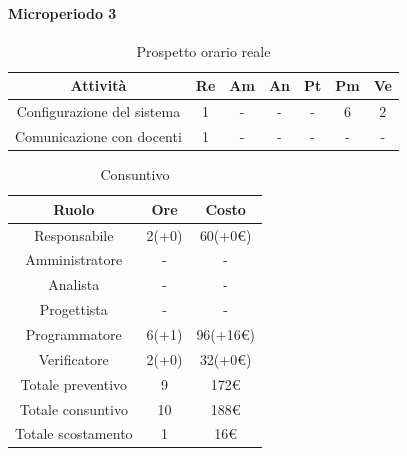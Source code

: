 \paragraph{Microperiodo 3}
\begin{table}[H]
	\centering
	\begin{tabular}{|c|c|c|c|c|c|c|}
		\hline
		\rowcolor{lighter-grayer}
		\textbf{Attività} & \textbf{Re}        & \textbf{Am}        & \textbf{An}        & \textbf{Pt}        & \textbf{Pm}        & \textbf{Ve}        \\ \hline
		
		Configurazione del sistema & 1 & - & - & - & 6 & 2 \\ \hline
		Comunicazione con docenti & 1 & - & - & - & - & - \\ \hline	
		
	\end{tabular}
	\caption{ Prospetto orario reale\\}
\end{table}

\begin{table}[H]
	\centering
	\renewcommand{\arraystretch}{1.5}
	\begin{tabular}{|c|c|c|}
		\hline
		\rowcolor{lighter-grayer}
		Ruolo & Ore & Costo \\ \hline
		Responsabile & 2(+0) & 60(+0\euro) \\ \hline
		Amministratore & - & - \\ \hline
		Analista & - & - \\ \hline
		Progettista & - & - \\ \hline
		Programmatore & 6(+1) & 96(+16\euro) \\ \hline
		Verificatore & 2(+0) & 32(+0\euro) \\ \hline
		Totale preventivo & 9 & 172\euro \\ \hline
		Totale consuntivo & 10 & 188\euro \\ \hline
		Totale scostamento & 1 & 16\euro \\ \hline
	\end{tabular}
	\caption{ Consuntivo\\}
\end{table}

